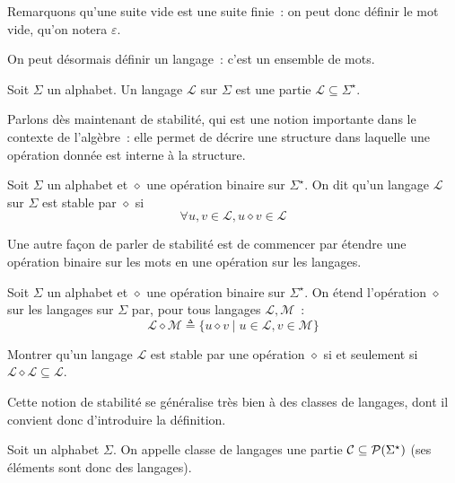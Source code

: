Remarquons qu'une suite vide est une suite finie~: on peut donc définir le mot
vide, qu'on notera $\varepsilon$.

On peut désormais définir un langage~: c'est un ensemble de mots.

\begin{definition}[Langage]
  Soit $\Sigma$ un alphabet. Un langage $\mathcal L$ sur $\Sigma$ est une partie
  $\mathcal L\subseteq\Sigma^\star$.
\end{definition}

Parlons dès maintenant de stabilité, qui est une notion importante dans le
contexte de l'algèbre~: elle permet de décrire une structure dans laquelle
une opération donnée est interne à la structure.

\begin{definition}[Stabilité]
  Soit $\Sigma$ un alphabet et $\diamond$ une opération binaire sur
  $\Sigma^\star$. On dit qu'un langage $\mathcal L$ sur $\Sigma$ est stable
  par $\diamond$ si
  \[\forall u,v\in \mathcal L, u\diamond v \in \mathcal L\]
\end{definition}

Une autre façon de parler de stabilité est de commencer par étendre une
opération binaire sur les mots en une opération sur les langages.

\begin{definition}
  Soit $\Sigma$ un alphabet et $\diamond$ une opération binaire sur
  $\Sigma^\star$. On étend l'opération $\diamond$ sur les langages sur
  $\Sigma$ par, pour tous langages $\mathcal L,\mathcal M$~:
  \[\mathcal L\diamond \mathcal M \triangleq
  \{u\diamond v \mid u \in \mathcal L, v \in \mathcal M\}\]
\end{definition}

\begin{exercise}
  Montrer qu'un langage $\mathcal L$ est stable par une opération $\diamond$ si
  et seulement si $\mathcal L \diamond \mathcal L \subseteq \mathcal L$.
\end{exercise}

Cette notion de stabilité se généralise très bien à des classes de langages,
dont il convient donc d'introduire la définition.

\begin{definition}
  Soit un alphabet $\Sigma$. On appelle classe de langages une partie
  $\mathcal C\subseteq \mathcal{P}(\Sigma^\star)$ (ses éléments sont donc des
  langages).
\end{definition}

